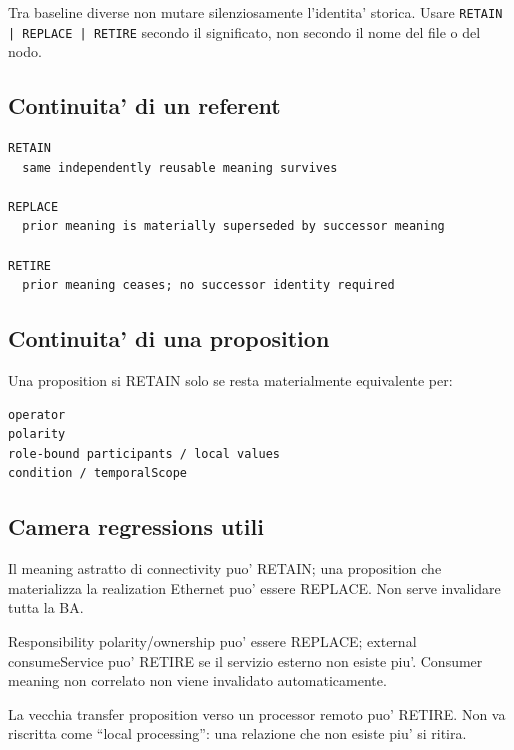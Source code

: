 \documentclass[11pt,a4paper]{article}
\newcommand{\code}[1]{\nolinkurl{#1}}
\begin{document}
\begin{statusclosed}[BA3 continuity]
Tra baseline diverse non mutare silenziosamente l'identita' storica. Usare \code{RETAIN | REPLACE | RETIRE} secondo il significato, non secondo il nome del file o del nodo.
\end{statusclosed}

\subsection{Continuita' di un referent}

\begin{lstlisting}
RETAIN
  same independently reusable meaning survives

REPLACE
  prior meaning is materially superseded by successor meaning

RETIRE
  prior meaning ceases; no successor identity required
\end{lstlisting}

\subsection{Continuita' di una proposition}

Una proposition si RETAIN solo se resta materialmente equivalente per:

\begin{lstlisting}
operator
polarity
role-bound participants / local values
condition / temporalScope
\end{lstlisting}

\subsection{Camera regressions utili}

\begin{examplebox}[Ethernet -> Wi-Fi]
Il meaning astratto di connectivity puo' RETAIN; una proposition che materializza la realization Ethernet puo' essere REPLACE. Non serve invalidare tutta la BA.
\end{examplebox}

\begin{examplebox}
Responsibility polarity/ownership puo' essere REPLACE; external consumeService puo' RETIRE se il servizio esterno non esiste piu'. Consumer meaning non correlato non viene invalidato automaticamente.
\end{examplebox}

\begin{examplebox}
La vecchia transfer proposition verso un processor remoto puo' RETIRE. Non va riscritta come ``local processing'': una relazione che non esiste piu' si ritira.
\end{examplebox}
\end{document}
